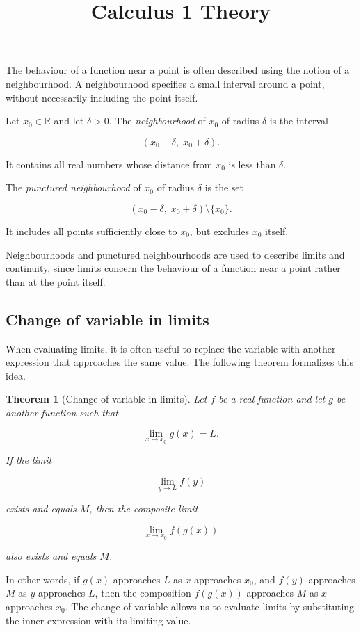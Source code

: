 \documentclass[11pt,a4paper]{article} \usepackage[T1]{fontenc}
\theoremstyle{plain} \newtheorem{theorem}{Theorem} \title{Calculus 1 Theory}
\begin{document}
The behaviour of a function near a point is often described using the notion of
a neighbourhood. A neighbourhood specifies a small interval around a point,
without necessarily including the point itself.

\begin{definition}
[Neighbourhood] Let $x_0 \in \mathbb{R}$ and let $\delta > 0$. The
\emph{neighbourhood} of $x_0$ of radius $\delta$ is the interval

\[
(x_0 - \delta,\; x_0 + \delta).
\]

It contains all real numbers whose distance from $x_0$ is less than $\delta$.
\end{definition}

\begin{definition}
 The \emph{punctured neighbourhood} of $x_0$ of radius
$\delta$ is the set

\[
(x_0 - \delta,\; x_0 + \delta) \setminus \{x_0\}.
\]

It includes all points sufficiently close to $x_0$, but excludes $x_0$ itself.
\end{definition}

Neighbourhoods and punctured neighbourhoods are used to describe limits and
continuity, since limits concern the behaviour of a function near a point
rather than at the point itself.

\subsection{Change of variable in limits}

When evaluating limits, it is often useful to replace the variable with another
expression that approaches the same value. The following theorem formalizes
this idea.

\begin{theorem}
[Change of variable in limits] Let $f$ be a real function and let $g$ be
another function such that

\[
\lim_{x \to x_0} g(x) = L.
\]

If the limit

\[
\lim_{y \to L} f(y)
\]

exists and equals $M$, then the composite limit

\[
\lim_{x \to x_0} f(g(x))
\]

also exists and equals $M$.
\end{theorem}

In other words, if $g(x)$ approaches $L$ as $x$ approaches $x_0$, and $f(y)$
approaches $M$ as $y$ approaches $L$, then the composition $f(g(x))$ approaches
$M$ as $x$ approaches $x_0$. The change of variable allows us to evaluate
limits by substituting the inner expression with its limiting value.
\end{document}
